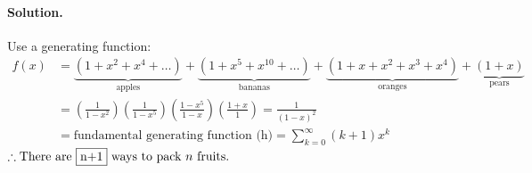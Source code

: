 \documentclass[11pt,twosided]{article}
\begin{document}
\paragraph{Solution.} Use a generating function:
\begin{align*}
    f(x)    &=  
    \underbrace{(1 + x^2 + x^4 + \dots)}_\text{apples} + 
    \underbrace{(1 + x^5 + x^{10} + \dots)}_\text{bananas} + 
    \underbrace{(1 + x + x^2 + x^3 + x^4)}_\text{oranges} + 
    \underbrace{(1 + x)}_\text{pears}\\
            &= \left(\frac{1}{1-x^2}\right) \left(\frac{1}{1-x^5}\right)
            \left(\frac{1-x^5}{1-x}\right)
            \left(\frac{1+x}{1}\right) = \frac{1}{(1-x)^2} \\
            &= \text{fundamental generating function (h)}
            =  \sum_{k=0}^{\infty} (k+1)x^k
\end{align*}
$\therefore \text{There are \boxed{$n+1$} ways to pack $n$ fruits.}$
\end{document}
